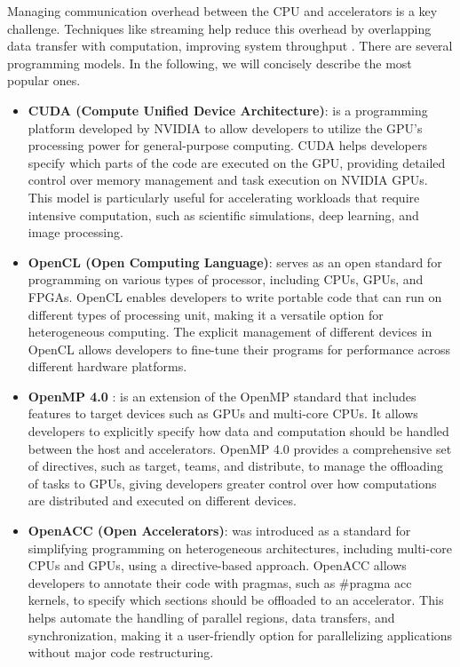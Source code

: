 Managing communication overhead between the CPU and accelerators is a key challenge. Techniques like streaming help reduce this overhead by overlapping data transfer with computation, improving system throughput \cite{Fang2020}. There are several programming models. In the following, we will concisely describe the most popular ones.

\begin{itemize}
    \item \textbf{CUDA (Compute Unified Device Architecture)}:  is a programming platform developed by NVIDIA to allow developers to utilize the GPU's processing power for general-purpose computing. CUDA helps developers specify which parts of the code are executed on the GPU, providing detailed control over memory management and task execution on NVIDIA GPUs. This model is particularly useful for accelerating workloads that require intensive computation, such as scientific simulations, deep learning, and image processing.
    \item \textbf{OpenCL (Open Computing Language)}: serves as an open standard for programming on various types of processor, including CPUs, GPUs, and FPGAs. OpenCL enables developers to write portable code that can run on different types of processing unit, making it a versatile option for heterogeneous computing. The explicit management of different devices in OpenCL allows developers to fine-tune their programs for performance across different hardware platforms.

    \item \textbf {OpenMP 4.0 }: is an extension of the OpenMP standard that includes features to target devices such as GPUs and multi-core CPUs. It allows developers to explicitly specify how data and computation should be handled between the host and accelerators. OpenMP 4.0 provides a comprehensive set of directives, such as target, teams, and distribute, to manage the offloading of tasks to GPUs, giving developers greater control over how computations are distributed and executed on different devices.

    \item \textbf {OpenACC (Open Accelerators)}:  was introduced as a standard for simplifying programming on heterogeneous architectures, including multi-core CPUs and GPUs, using a directive-based approach. OpenACC allows developers to annotate their code with pragmas, such as \#pragma acc kernels, to specify which sections should be offloaded to an accelerator. This helps automate the handling of parallel regions, data transfers, and synchronization, making it a user-friendly option for parallelizing applications without major code restructuring.


\end{itemize}
